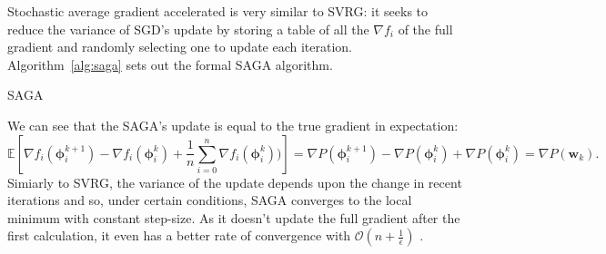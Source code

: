 Stochastic average gradient accelerated is very similar to SVRG: it seeks to reduce the variance of SGD's update by storing a table of all the $\nabla f_i$ of the full gradient and randomly selecting one to update each iteration. Algorithm~\ref{alg:saga} sets out the formal SAGA algorithm.

\begin{algorithm}[bth]
    \caption{SAGA \cite{defazio2014saga}}
    \label{alg:saga}
\end{algorithm}
We can see that the SAGA's update is equal to the true gradient in expectation:
\begin{equation}\label{stochastic gradient in SAGA}
    \mathbb{E}[\nabla f_i(\mathbf{\phi}_i^{k+1}) - \nabla f_i(\mathbf{\phi}_i^{k}) + \frac{1}{n}\sum_{i=0}^n \nabla f_i(\mathbf{\phi}_i^k))] = \nabla P({\mathbf{\phi}_i^{k+1}}) - \nabla P({\mathbf{\phi}_i^{k}}) + \nabla P({\mathbf{\phi}_i^{k}}) = \nabla P({\mathbf{w}}_k).
\end{equation}
Simiarly to SVRG, the variance of the update depends upon the change in recent iterations and so, under certain conditions, SAGA converges to the local minimum with constant step-size. As it doesn't update the full gradient after the first calculation, it even has a better rate of convergence with $\mathcal{O}\left(n + \frac{1}{\epsilon}\right)$ \cite{defazio2014saga}.